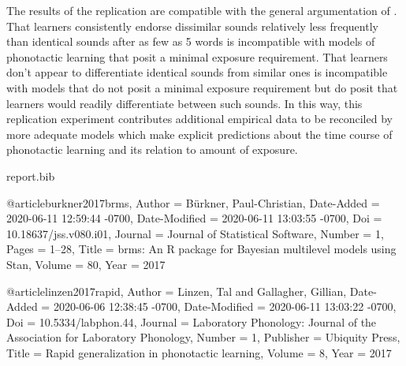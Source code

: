 \documentclass[letterpaper,11pt]{article}
\begin{document}
The results of the replication are compatible with the general argumentation of \textcite[][]{linzen2017rapid}.
That learners consistently endorse dissimilar sounds relatively less frequently than identical sounds after as few as 5 words is incompatible with models of phonotactic learning that posit a minimal exposure requirement.
That learners don't appear to differentiate identical sounds from similar ones is incompatible with models that do not posit a minimal exposure requirement but do posit that learners would readily differentiate between such sounds.
In this way, this replication experiment contributes additional empirical data to be reconciled by more adequate models which make explicit predictions about the time course of phonotactic learning and its relation to amount of exposure.







\nocite{linzen2017rapid,san2020replication}
\printbibliography

\begin{filecontents}{report.bib}

@article{burkner2017brms,
    Author = {Bürkner, Paul-Christian},
    Date-Added = {2020-06-11 12:59:44 -0700},
    Date-Modified = {2020-06-11 13:03:55 -0700},
    Doi = {10.18637/jss.v080.i01},
    Journal = {Journal of Statistical Software},
    Number = {1},
    Pages = {1--28},
    Title = {{b}rms: An {R} package for {B}ayesian multilevel models using {S}tan},
    Volume = {80},
    Year = {2017}}

@article{linzen2017rapid,
    Author = {Linzen, Tal and Gallagher, Gillian},
    Date-Added = {2020-06-06 12:38:45 -0700},
    Date-Modified = {2020-06-11 13:03:22 -0700},
    Doi = {10.5334/labphon.44},
    Journal = {Laboratory Phonology: Journal of the Association for Laboratory Phonology},
    Number = {1},
    Publisher = {Ubiquity Press},
    Title = {Rapid generalization in phonotactic learning},
    Volume = {8},
    Year = {2017}}

\end{filecontents}
\end{document}

